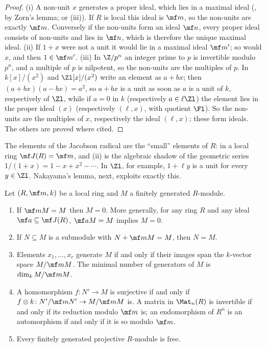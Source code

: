 \begin{proof}
(i) A non-unit $x$ generates a proper ideal, which lies in a maximal ideal (, by Zorn's lemma; or
(iii)). If $R$ is local this ideal is $\mf m$, so the non-units are exactly $\mf m$. Conversely if
the non-units form an ideal $\mf n$, every proper ideal consists of non-units and lies in $\mf n$, which is therefore the unique
maximal ideal. (ii) If $1+x$ were not a unit it would lie in a maximal ideal $\mf m'$; so would $x$, and then $1\in\mf m'$.
(iii) In $\Z/p^n$ an integer prime to $p$ is invertible modulo $p^n$, and a multiple of $p$ is nilpotent, so the non-units are the multiples
of $p$. In $k[x]/(x^2)$ and $\Zl[x]/(x^2)$ write an element as $a+bx$; then $(a+bx)(a-bx)=a^2$, so $a+bx$ is a unit as soon as $a$ is a unit
of $k$, respectively of $\Zl$, while if $a=0$ in $k$ (respectively $a\in\ell\Zl$) the element lies in the proper ideal $(x)$ (respectively
$(\ell,x)$, with quotient $\Fl$). So the non-units are the multiples of $x$, respectively the ideal $(\ell,x)$; these form ideals. The others
are proved where cited.
\end{proof}

The elements of the Jacobson radical are the ``small'' elements of $R$: in a local ring $\mf J(R)=\mf m$, and (ii) is the algebraic shadow
of the geometric series $1/(1+x)=1-x+x^2-\cdots$. In $\Zl$, for example, $1+\ell y$ is a unit for every $y\in\Zl$. Nakayama's lemma, next,
exploits exactly this.

\begin{theorem}\label{thm:modules:nakayama}
Let $(R,\mf m,k)$ be a local ring and $M$ a finitely generated $R$-module.
\begin{enumerate}[label=(\roman*)]
\item If $\mf mM=M$ then $M=0$. More generally, for any ring $R$ and any ideal $\mf a\subseteq\mf J(R)$, $\mf aM=M$ implies $M=0$.
\item If $N\subseteq M$ is a submodule with $N+\mf mM=M$, then $N=M$.
\item Elements $x_1,\dots,x_r$ generate $M$ if and only if their images span the $k$-vector space $M/\mf mM$. The minimal number of
generators of $M$ is $\dim_kM/\mf mM$.
\item A homomorphism $f\colon N'\to M$ is surjective if and only if $f\otimes k\colon N'/\mf mN'\to M/\mf mM$ is. A matrix in $\Mat_n(R)$ is
invertible if and only if its reduction modulo $\mf m$ is; an endomorphism of $R^n$ is an automorphism if and only if it is so
modulo $\mf m$.
\item Every finitely generated projective $R$-module is free.
\end{enumerate}
\end{theorem}

